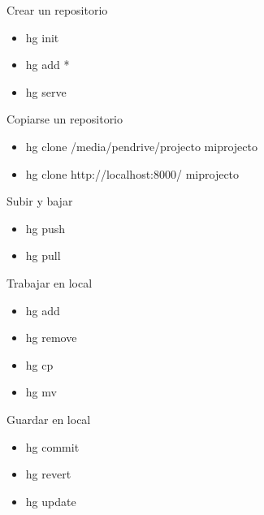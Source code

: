 \documentclass[spanish]{beamer}
\begin{document}
        
        \begin{frame}{Crear un repositorio}
            \begin{itemize}
                \item hg init
                \item hg add *
                \item hg serve
            \end{itemize}
        \end{frame}
        
        
        \begin{frame}{Copiarse un repositorio}
            \begin{itemize}
                \item hg clone /media/pendrive/projecto miprojecto
                \item hg clone http://localhost:8000/ miprojecto
            \end{itemize}
        \end{frame}
        
       
        \begin{frame}{Subir y bajar}
             \begin{itemize}
                \item hg push
                \item hg pull
             \end{itemize}
	\end{frame}
 
        \begin{frame}{Trabajar en local}
             \begin{itemize}
                \item hg add
                \item hg remove
                \item hg cp
                \item hg mv
             \end{itemize}
        \end{frame}
 
        \begin{frame}{Guardar en local}
             \begin{itemize}
                \item hg commit
                \item hg revert
                \item hg update
             \end{itemize}
        \end{frame}
 
\end{document}
